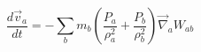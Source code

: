 \documentclass[12pt]{article}
\begin{document}
$$
   \frac{d\vec{v}_a}{dt} = - \sum_b m_b \left( \frac{P_a}{\rho_a^2} + \frac{P_b}{\rho_b^2} \right) \vec{\nabla}_a W_{ab}
$$
\end{document}
